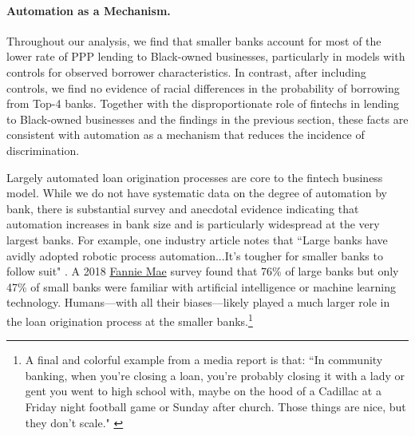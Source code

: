 \documentclass[11pt]{article}
\begin{document}
\paragraph*{Automation as a Mechanism.} 

Throughout our analysis, we find that smaller banks account for most of the lower rate of PPP lending to Black-owned businesses, particularly in models with controls for observed borrower characteristics. In contrast, after including controls, we find no evidence of racial differences in the probability of borrowing from Top-4 banks. Together with the disproportionate role of fintechs in lending to Black-owned businesses and the findings in the previous section, these facts are consistent with automation as a mechanism that reduces the incidence of discrimination. 

Largely automated loan origination processes are core to the fintech business model. While we do not have systematic data on the degree of automation by bank, there is substantial survey and anecdotal evidence indicating that automation increases in bank size and is particularly widespread at the very largest banks. For example, one industry article notes that ``Large banks have avidly adopted robotic process automation...It's tougher for smaller banks to follow suit" \citep{Crosman2020}. A 2018 \href{https://www.fanniemae.com/media/20256/display}{Fannie Mae} survey found that 76\% of large banks but only 47\% of small banks were familiar with artificial intelligence or machine learning  technology. Humans---with all their biases---likely played a much larger role in the loan origination process at the smaller banks.\footnote{A final and colorful example from a media report is that:  “In community banking, when you’re closing a loan, you’re probably closing it with a lady or gent you went to high school with, maybe on the hood of a Cadillac at a Friday night football game or Sunday after church. Those things are nice, but they don't scale." \citep{Cross2020}}
\end{document}
